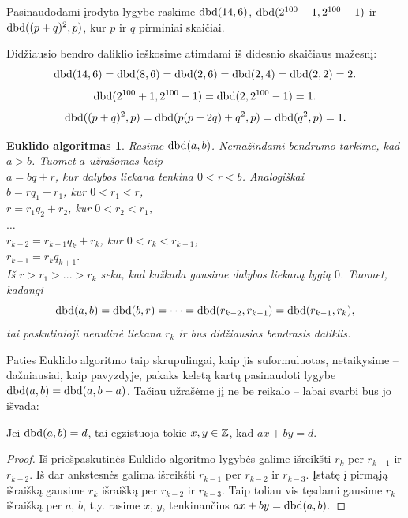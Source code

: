 \begin{pav}
  Pasinaudodami įrodyta lygybe raskime $\operatorname{dbd}(14,6)$,
  $\operatorname{dbd}(2^{100}+1, 2^{100}-1)$ ir $\operatorname{dbd}( (p+q)^2, p)$, kur $p$ ir
  $q$ pirminiai skaičiai. 
\end{pav}

\begin{sprendimas}
Didžiausio bendro daliklio ieškosime atimdami iš didesnio skaičiaus
mažesnį:
$$\operatorname{dbd}(14,6) = \operatorname{dbd}(8,6) = \operatorname{dbd}(2,6) = \operatorname{dbd}(2,4) = \operatorname{dbd}(2,2)= 2.$$
$$\operatorname{dbd}(2^{100} + 1, 2^{100} - 1) = \operatorname{dbd}(2,2^{100}-1) = 1.$$
$$\operatorname{dbd}( (p+q)^2, p) = \operatorname{dbd}(p(p + 2q) + q^2, p) = \operatorname{dbd}(q^2 , p) = 1.$$
\end{sprendimas}

\theoremstyle{plain}\newtheorem*{euklidoalg}{Euklido algoritmas}
\begin{euklidoalg} Rasime $\operatorname{dbd}(a,b)$. Nemažindami bendrumo tarkime, kad $a > b$. Tuomet $a$
užrašomas kaip \\
$a = bq + r$, kur dalybos liekana tenkina $0 < r < b$. Analogiškai \\
$b = rq_{1} + r_{1}$, kur $0 < r_{1} < r$, \\
$r = r_{1}q_{2} + r_{2}$, kur $0 < r_{2} < r_{1}$, \\
$\hdots$ \\
$r_{k-2} = r_{k-1}q_{k} + r_{k}$, kur $0 < r_{k} < r_{k-1}$,
\\
$r_{k-1} = r_{k}q_{k+1}.$ \\

Iš $r > r_{1} > ... > r_{k}$ seka, kad kažkada gausime dalybos liekaną
lygią $0$. Tuomet, kadangi $$\operatorname{dbd}(a,b) = \operatorname{dbd}(b,r) = \cdots =
\operatorname{dbd}(r_{k-2},r_{k-1}) = \operatorname{dbd}(r_{k-1},r_{k}),$$ tai paskutinioji nenulinė
liekana $r_{k}$ ir bus didžiausias bendrasis daliklis.
\end{euklidoalg}

Paties Euklido algoritmo taip skrupulingai, kaip jis suformuluotas,
netaikysime -- dažniausiai, kaip pavyzdyje, pakaks keletą kartų pasinaudoti
lygybe $\operatorname{dbd}(a,b) = \operatorname{dbd}(a, b-a)$. Tačiau užrašėme jį ne be reikalo -- labai
svarbi bus jo išvada:

\begin{isv} 
  Jei $\operatorname{dbd}(a,b)=d$, tai egzistuoja tokie $x,y \in \mathbb Z$, kad $ax + by = d$.
\end{isv}

\begin{proof}
  Iš priešpaskutinės Euklido algoritmo lygybės galime išreikšti $r_{k}$ per
  $r_{k-1}$ ir $r_{k-2}$. Iš dar ankstesnės galima išreikšti $r_{k-1}$ per
  $r_{k-2}$ ir $r_{k−3}$. Įstatę į pirmąją išraišką gausime $r_{k}$ išraišką
  per $r_{k-2}$ ir $r_{k−3}$. Taip toliau vis tęsdami gausime $r_{k}$ išraišką
  per $a$, $b$, t.y. rasime $x$, $y$, tenkinančius $ax + by = \operatorname{dbd}(a,b).$
\end{proof}

